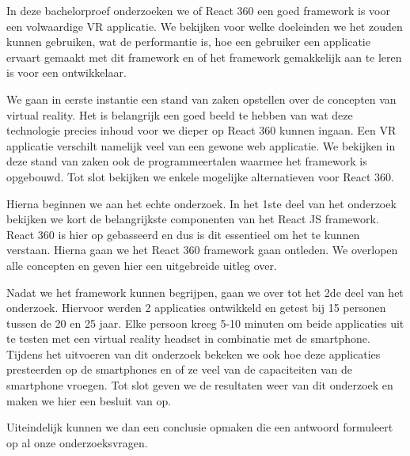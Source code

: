 In deze bachelorproef onderzoeken we of React 360 een goed framework is voor een volwaardige VR applicatie. We bekijken voor welke doeleinden we het zouden kunnen gebruiken, wat de performantie is, hoe een gebruiker een applicatie ervaart gemaakt met dit framework en of het framework gemakkelijk aan te leren is voor een ontwikkelaar.

We gaan in eerste instantie een stand van zaken opstellen over de concepten van virtual reality. Het is belangrijk een goed beeld te hebben van wat deze technologie precies inhoud voor we dieper op React 360 kunnen ingaan. Een VR applicatie verschilt namelijk veel van een gewone web applicatie. We bekijken in deze stand van zaken ook de programmeertalen waarmee het framework is opgebouwd. Tot slot bekijken we enkele mogelijke alternatieven voor React 360.

Hierna beginnen we aan het echte onderzoek. In het 1ste deel van het onderzoek bekijken we kort de belangrijkste componenten van het React JS framework. React 360 is hier op gebasseerd en dus is dit essentieel om het te kunnen verstaan. Hierna gaan we het React 360 framework gaan ontleden. We overlopen alle concepten en geven hier een uitgebreide uitleg over.

Nadat we het framework kunnen begrijpen, gaan we over tot het 2de deel van het onderzoek. Hiervoor werden 2 applicaties ontwikkeld en getest bij 15 personen tussen de 20 en 25 jaar. Elke persoon kreeg 5-10 minuten om beide applicaties uit te testen met een virtual reality headset in combinatie met de smartphone. Tijdens het uitvoeren van dit onderzoek bekeken we ook hoe deze applicaties presteerden op de smartphones en of ze veel van de capaciteiten van de smartphone vroegen. Tot slot geven we de resultaten weer van dit onderzoek en maken we hier een besluit van op.

Uiteindelijk kunnen we dan een conclusie opmaken die een antwoord formuleert op al onze onderzoeksvragen.
